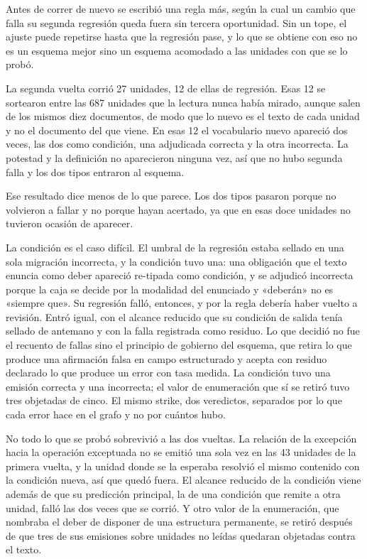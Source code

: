 \documentclass[12pt,a4paper]{report}
\begin{document}
Antes de correr de nuevo se escribió una regla más, según la cual un cambio que falla su segunda regresión queda fuera sin tercera oportunidad. Sin un tope, el ajuste puede repetirse hasta que la regresión pase, y lo que se obtiene con eso no es un esquema mejor sino un esquema acomodado a las unidades con que se lo probó.

La segunda vuelta corrió 27 unidades, 12 de ellas de regresión. Esas 12 se sortearon entre las 687 unidades que la lectura nunca había mirado, aunque salen de los mismos diez documentos, de modo que lo nuevo es el texto de cada unidad y no el documento del que viene. En esas 12 el vocabulario nuevo apareció dos veces, las dos como condición, una adjudicada correcta y la otra incorrecta. La potestad y la definición no aparecieron ninguna vez, así que no hubo segunda falla y los dos tipos entraron al esquema.

Ese resultado dice menos de lo que parece. Los dos tipos pasaron porque no volvieron a fallar y no porque hayan acertado, ya que en esas doce unidades no tuvieron ocasión de aparecer.

La condición es el caso difícil. El umbral de la regresión estaba sellado en una sola migración incorrecta, y la condición tuvo una: una obligación que el texto enuncia como deber apareció re-tipada como condición, y se adjudicó incorrecta porque la caja se decide por la modalidad del enunciado y «deberán» no es «siempre que». Su regresión falló, entonces, y por la regla debería haber vuelto a revisión. Entró igual, con el alcance reducido que su condición de salida tenía sellado de antemano y con la falla registrada como residuo. Lo que decidió no fue el recuento de fallas sino el principio de gobierno del esquema, que retira lo que produce una afirmación falsa en campo estructurado y acepta con residuo declarado lo que produce un error con tasa medida. La condición tuvo una emisión correcta y una incorrecta; el valor de enumeración que sí se retiró tuvo tres objetadas de cinco. El mismo strike, dos veredictos, separados por lo que cada error hace en el grafo y no por cuántos hubo.

No todo lo que se probó sobrevivió a las dos vueltas. La relación de la excepción hacia la operación exceptuada no se emitió una sola vez en las 43 unidades de la primera vuelta, y la unidad donde se la esperaba resolvió el mismo contenido con la condición nueva, así que quedó fuera. El alcance reducido de la condición viene además de que su predicción principal, la de una condición que remite a otra unidad, falló las dos veces que se corrió. Y otro valor de la enumeración, que nombraba el deber de disponer de una estructura permanente, se retiró después de que tres de sus emisiones sobre unidades no leídas quedaran objetadas contra el texto.
\end{document}
